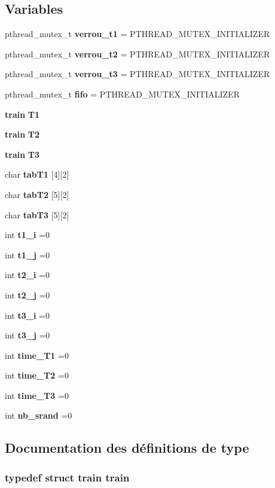 \subsection*{Variables}
\begin{DoxyCompactItemize}
\item 
pthread\+\_\+mutex\+\_\+t {\bf verrou\+\_\+t1} = P\+T\+H\+R\+E\+A\+D\+\_\+\+M\+U\+T\+E\+X\+\_\+\+I\+N\+I\+T\+I\+A\+L\+I\+Z\+ER
\item 
pthread\+\_\+mutex\+\_\+t {\bf verrou\+\_\+t2} = P\+T\+H\+R\+E\+A\+D\+\_\+\+M\+U\+T\+E\+X\+\_\+\+I\+N\+I\+T\+I\+A\+L\+I\+Z\+ER
\item 
pthread\+\_\+mutex\+\_\+t {\bf verrou\+\_\+t3} = P\+T\+H\+R\+E\+A\+D\+\_\+\+M\+U\+T\+E\+X\+\_\+\+I\+N\+I\+T\+I\+A\+L\+I\+Z\+ER
\item 
pthread\+\_\+mutex\+\_\+t {\bf fifo} = P\+T\+H\+R\+E\+A\+D\+\_\+\+M\+U\+T\+E\+X\+\_\+\+I\+N\+I\+T\+I\+A\+L\+I\+Z\+ER
\item 
{\bf train} {\bf T1}
\item 
{\bf train} {\bf T2}
\item 
{\bf train} {\bf T3}
\item 
char {\bf tab\+T1} [4][2]
\item 
char {\bf tab\+T2} [5][2]
\item 
char {\bf tab\+T3} [5][2]
\item 
int {\bf t1\+\_\+i} =0
\item 
int {\bf t1\+\_\+j} =0
\item 
int {\bf t2\+\_\+i} =0
\item 
int {\bf t2\+\_\+j} =0
\item 
int {\bf t3\+\_\+i} =0
\item 
int {\bf t3\+\_\+j} =0
\item 
int {\bf time\+\_\+\+T1} =0
\item 
int {\bf time\+\_\+\+T2} =0
\item 
int {\bf time\+\_\+\+T3} =0
\item 
int {\bf nb\+\_\+srand} =0
\end{DoxyCompactItemize}


\subsection{Documentation des définitions de type}
\subsubsection[{train}]{\setlength{\rightskip}{0pt plus 5cm}typedef struct {\bf train} {\bf train}}\label{thread_8h_ac5e7144c0ff0fd46a7f4a5ff8cab1e72}


